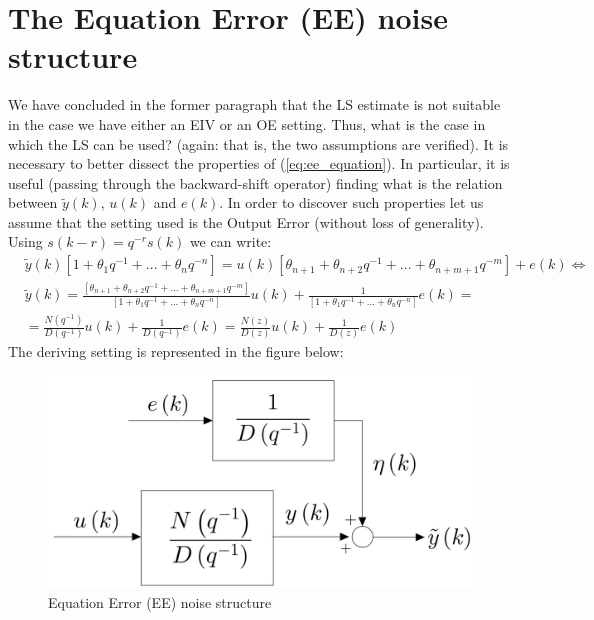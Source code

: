 \section{The Equation Error (EE) noise structure}
We have concluded in the former paragraph that the LS estimate is not suitable in the case we have either an EIV or an OE setting. Thus, what is the case in which the LS can be used? (again: that is, the two assumptions are verified). It is necessary to better dissect the properties of (\ref{eq:ee_equation}). In particular, it is useful (passing through the backward-shift operator) finding what is the relation between $\tilde{y}(k)$, $u(k)$ and $e(k)$. In order to discover such properties let us assume that the setting used is the Output Error (without loss of generality). Using $s(k-r)=q^{-r}s(k)$ we can write: 
\begin{align}
    &\tilde{y}(k) [1+\theta_1{q^{-1}}+...+\theta_n{q^{-n}}]= u(k) [\theta_{n+1}+\theta_{n+2}q^{-1}+...+\theta_{n+m+1}q^{-m}]+e(k) \iff\\
    &\tilde{y}(k) = \frac{[\theta_{n+1}+\theta_{n+2}q^{-1}+...+\theta_{n+m+1}q^{-m}]}{[1+\theta_1{q^{-1}}+...+\theta_n{q^{-n}}]} u(k) + \frac{1}{[1+\theta_1{q^{-1}}+...+\theta_n{q^{-n}}]}e(k) = \\
    &=\frac{N(q^{-1})}{D(q^{-1})} u(k)+\frac{1}{D(q^{-1})}e(k)=\frac{N(z)}{D(z)} u(k)+\frac{1}{D(z)}e(k)
\end{align}
The deriving setting is represented in the figure below:
\begin{figure}[h]
    \centering
    \includegraphics[scale=0.15]{img/EE.jpeg}
    \caption{Equation Error (EE) noise structure}
\end{figure}

